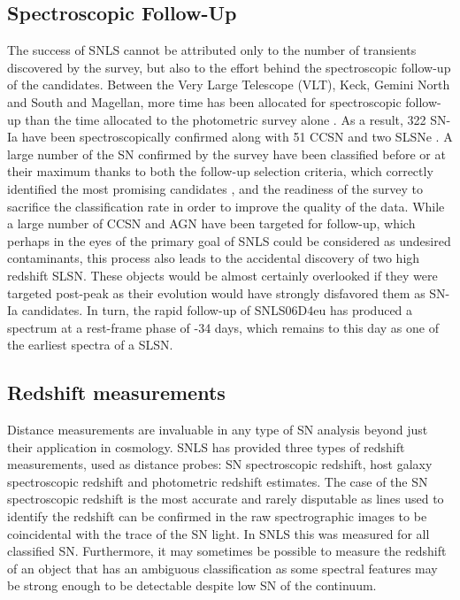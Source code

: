 \subsection{Spectroscopic Follow-Up}
The success of SNLS cannot be attributed only to the number of transients discovered by the survey, but also to the effort behind the spectroscopic follow-up of the candidates. Between the Very Large Telescope (VLT), Keck, Gemini North and South and Magellan, more time has been allocated for spectroscopic follow-up than the time allocated to the photometric survey alone \citep{Pritchet2004}. As a result, 322 SN-Ia have been spectroscopically confirmed along with 51 CCSN and two SLSNe \citep{Guy2010,Howell2005,Howell2013}. A large number of the SN confirmed by the survey have been classified before or at their maximum thanks to both the follow-up selection criteria, which correctly identified the most promising candidates \citep{Sullivan2006}, and the readiness of the survey to sacrifice the classification rate in order to improve the quality of the data. While a large number of CCSN and AGN have been targeted for follow-up, which perhaps in the eyes of the primary goal of SNLS could be considered as undesired contaminants, this process also leads to the accidental discovery of two high redshift SLSN. These objects would be almost certainly overlooked if they were targeted post-peak as their evolution would have strongly disfavored them as SN-Ia candidates. In turn, the rapid follow-up of SNLS06D4eu has produced a spectrum at a rest-frame phase of -34 days, which remains to this day as one of the earliest spectra of a SLSN.

\subsection{Redshift measurements}
Distance measurements are invaluable in any type of SN analysis beyond just their application in cosmology. SNLS has provided three types of redshift measurements, used as distance probes: SN spectroscopic redshift, host galaxy spectroscopic redshift and photometric redshift estimates. The case of the SN spectroscopic redshift is the most accurate and rarely disputable as lines used to identify the redshift can be confirmed in the raw spectrographic images to be coincidental with the trace of the SN light. In SNLS this was measured for all classified SN. Furthermore, it may sometimes be possible to measure the redshift of an object that has an ambiguous classification as some spectral features may be strong enough to be detectable despite low S\/N of the continuum.


